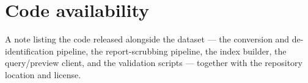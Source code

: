 
\section*{Code availability}\label{sec:code}

A note listing the code released alongside the dataset --- the conversion and
de-identification pipeline, the report-scrubbing pipeline, the index builder, the
query/preview client, and the validation scripts --- together with the
repository location and license.
